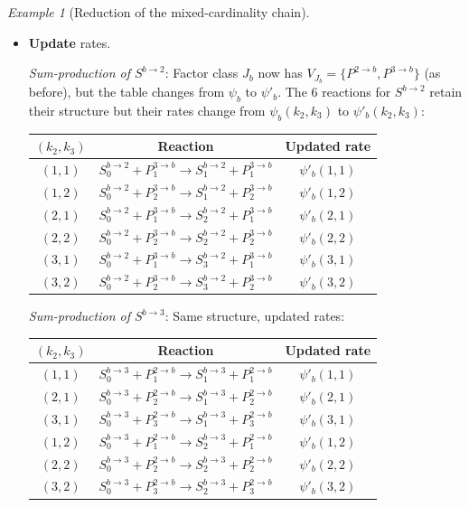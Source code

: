 \documentclass{article}
\theoremstyle{plain}
\theoremstyle{definition}
\theoremstyle{remark}
\newtheorem{example}{Example}[section]
\newcommand{\<}{\langle}
\renewcommand{\>}{\rangle}
\begin{document}
\begin{example}[Reduction of the mixed-cardinality chain]
\begin{itemize}
\item[$\psi$:] \textbf{Update} rates.
 
  \emph{Sum-production of $S^{b\to 2}$}:
  Factor class $J_b$ now has $V_{J_b}=\{P^{2\to b}, P^{3\to b}\}$
  (as before), but the table changes from $\psi_b$ to $\psi'_b$.
  The 6 reactions for $S^{b\to 2}$ retain their structure but their
  rates change from $\psi_b(k_2,k_3)$ to $\psi'_b(k_2,k_3)$:
  \begin{center}
  \renewcommand{\arraystretch}{1.3}
  \begin{tabular}{@{}ccc@{}}
  \toprule
  $(k_2,k_3)$ & Reaction & Updated rate \\
  \midrule
  $(1,1)$ & $S^{b\to 2}_0 + P^{3\to b}_1 \to S^{b\to 2}_1 + P^{3\to b}_1$ & $\psi'_b(1,1)$ \\
  $(1,2)$ & $S^{b\to 2}_0 + P^{3\to b}_2 \to S^{b\to 2}_1 + P^{3\to b}_2$ & $\psi'_b(1,2)$ \\
  $(2,1)$ & $S^{b\to 2}_0 + P^{3\to b}_1 \to S^{b\to 2}_2 + P^{3\to b}_1$ & $\psi'_b(2,1)$ \\
  $(2,2)$ & $S^{b\to 2}_0 + P^{3\to b}_2 \to S^{b\to 2}_2 + P^{3\to b}_2$ & $\psi'_b(2,2)$ \\
  $(3,1)$ & $S^{b\to 2}_0 + P^{3\to b}_1 \to S^{b\to 2}_3 + P^{3\to b}_1$ & $\psi'_b(3,1)$ \\
  $(3,2)$ & $S^{b\to 2}_0 + P^{3\to b}_2 \to S^{b\to 2}_3 + P^{3\to b}_2$ & $\psi'_b(3,2)$ \\
  \bottomrule
  \end{tabular}
  \end{center}
 
  \emph{Sum-production of $S^{b\to 3}$}:
  Same structure, updated rates:
  \begin{center}
  \renewcommand{\arraystretch}{1.3}
  \begin{tabular}{@{}ccc@{}}
  \toprule
  $(k_2,k_3)$ & Reaction & Updated rate \\
  \midrule
  $(1,1)$ & $S^{b\to 3}_0 + P^{2\to b}_1 \to S^{b\to 3}_1 + P^{2\to b}_1$ & $\psi'_b(1,1)$ \\
  $(2,1)$ & $S^{b\to 3}_0 + P^{2\to b}_2 \to S^{b\to 3}_1 + P^{2\to b}_2$ & $\psi'_b(2,1)$ \\
  $(3,1)$ & $S^{b\to 3}_0 + P^{2\to b}_3 \to S^{b\to 3}_1 + P^{2\to b}_3$ & $\psi'_b(3,1)$ \\
  $(1,2)$ & $S^{b\to 3}_0 + P^{2\to b}_1 \to S^{b\to 3}_2 + P^{2\to b}_1$ & $\psi'_b(1,2)$ \\
  $(2,2)$ & $S^{b\to 3}_0 + P^{2\to b}_2 \to S^{b\to 3}_2 + P^{2\to b}_2$ & $\psi'_b(2,2)$ \\
  $(3,2)$ & $S^{b\to 3}_0 + P^{2\to b}_3 \to S^{b\to 3}_2 + P^{2\to b}_3$ & $\psi'_b(3,2)$ \\
  \bottomrule
  \end{tabular}
  \end{center}
 

\end{itemize}
\end{example}
\end{document}
